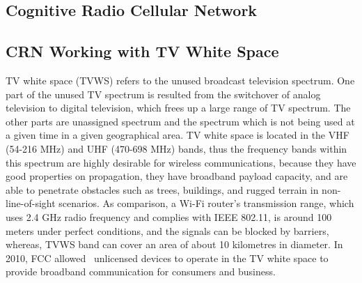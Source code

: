 \subsection{Cognitive Radio Cellular Network}


\subsection{CRN Working with TV White Space}
\label{TVWS}


TV white space (\gls{TVWS}) refers to the unused broadcast television spectrum.
One part of the unused TV spectrum is resulted from the switchover of analog television to digital television, which frees up a large range of TV spectrum.
The other parts are unassigned spectrum and the spectrum which is not being used at a given time in a given geographical area.
TV white space is located in the VHF (54-216 MHz) and UHF (470-698 MHz) bands, thus the frequency bands within this spectrum are highly desirable for wireless communications, because they have good properties on propagation, \ie they have broadband payload capacity, and are able to penetrate obstacles such as trees, buildings, and rugged terrain in non-line-of-sight scenarios.
As comparison, a Wi-Fi router's transmission range, which uses 2.4 GHz radio frequency and complies with IEEE 802.11, is around 100 meters under perfect conditions, and the signals can be blocked by barriers, whereas, TVWS band can cover an area of about 10 kilometres in diameter.
In 2010, FCC allowed~\cite{FCC_2010_sedond_memorandumm} unlicensed devices to operate in the TV white space to provide broadband communication for consumers and business.

